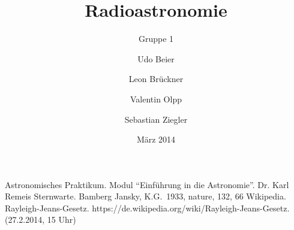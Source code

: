 
%
%


\title{Radioastronomie}
\subtitle{Gruppe 1}
\date{März 2014}
\author{Udo Beier \and Leon Brückner \and Valentin Olpp \and Sebastian Ziegler}

\maketitle
\tableofcontents
\newpage
\listoffigures
\listoftables
\newpage
%
\newpage



%
%

%
\newpage
%
%
%
\begin{thebibliography}{9}
 Astronomisches Praktikum. Modul \enquote{Einführung in die Astronomie}. Dr. Karl Remeis Sternwarte. Bamberg
 Jansky, K.G.\ 1933, nature, 132, 66 
 Wikipedia. Rayleigh-Jeans-Gesetz. https://de.wikipedia.org/wiki/Rayleigh-Jeans-Gesetz. (27.2.2014, 15 Uhr)
\end{thebibliography}
